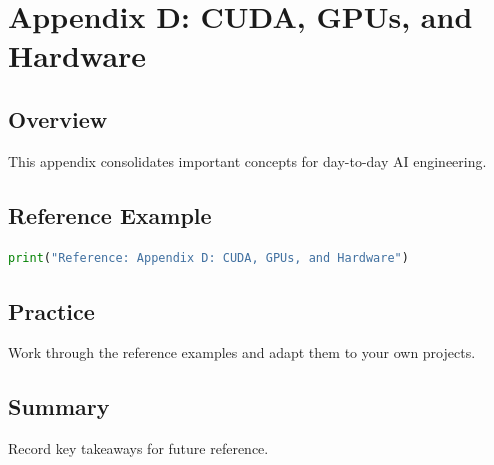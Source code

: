 \chapter{Appendix D: CUDA, GPUs, and Hardware}
\label{chap:vol12-4}



\section{Overview}
This appendix consolidates important concepts for day-to-day AI engineering.

\section{Reference Example}
\begin{lstlisting}[language=Python]
print("Reference: Appendix D: CUDA, GPUs, and Hardware")
\end{lstlisting}

\section{Practice}
\begin{exercise}
Work through the reference examples and adapt them to your own projects.
\end{exercise}

\section{Summary}
Record key takeaways for future reference.
